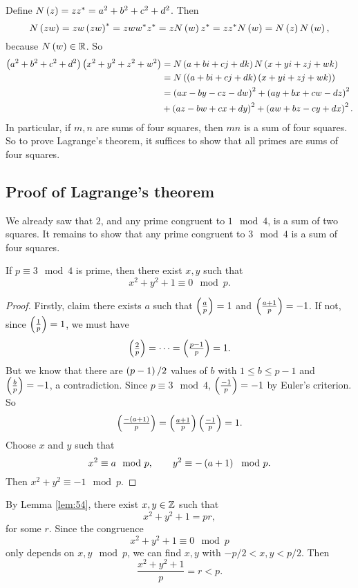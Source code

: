 Define $ N\left( z \right) = zz^* = a^2 + b^2 + c^2 + d^2 $. Then
$$ N\left( zw \right) = zw\left( zw \right)^* = zww^*z^* = zN\left( w \right)z^* = zz^*N\left( w \right) = N\left( z \right)N\left( w \right), $$
because $ N\left( w \right) \in \mathbb{R} $. So
\begin{align*}
\left( a^2 + b^2 + c^2 + d^2 \right)\left( x^2 + y^2 + z^2 + w^2 \right)
& = N\left( a + bi + cj + dk \right)N\left( x + yi + zj + wk \right) \\
& = N\left( \left( a + bi + cj + dk \right)\left( x + yi + zj + wk \right) \right) \\
& = \left( ax - by - cz - dw \right)^2 + \left( ay + bx + cw - dz \right)^2 \\
& + \left( az - bw + cx + dy \right)^2 + \left( aw + bz - cy + dx \right)^2.
\end{align*}
In particular, if $ m, n $ are sums of four squares, then $ mn $ is a sum of four squares. So to prove Lagrange's theorem, it suffices to show that all primes are sums of four squares.

\subsection{Proof of Lagrange's theorem}

We already saw that $ 2 $, and any prime congruent to $ 1 \mod 4 $, is a sum of two squares. It remains to show that any prime congruent to $ 3 \mod 4 $ is a sum of four squares.


\begin{lemma}
\label{lem:54}
If $ p \equiv 3 \mod 4 $ is prime, then there exist $ x, y $ such that
$$ x^2 + y^2 + 1 \equiv 0 \mod p. $$
\end{lemma}

\begin{proof}
Firstly, claim there exists $ a $ such that $ \left( \tfrac{a}{p} \right) = 1 $ and $ \left( \tfrac{a + 1}{p} \right) = -1 $. If not, since $ \left( \tfrac{1}{p} \right) = 1 $, we must have
$$ \left( \tfrac{2}{p} \right) = \dots = \left( \tfrac{p - 1}{p} \right) = 1. $$
But we know that there are $ \left( p - 1 \right) / 2 $ values of $ b $ with $ 1 \le b \le p - 1 $ and $ \left( \tfrac{b}{p} \right) = -1 $, a contradiction. Since $ p \equiv 3 \mod 4 $, $ \left( \tfrac{-1}{p} \right) = -1 $ by Euler's criterion. So
$$ \left( \tfrac{-\left( a + 1 \right)}{p} \right) = \left( \tfrac{a + 1}{p} \right)\left( \tfrac{-1}{p} \right) = 1. $$
Choose $ x $ and $ y $ such that
$$ x^2 \equiv a \mod p, \qquad y^2 \equiv -\left( a + 1 \right) \mod p. $$
Then $ x^2 + y^2 \equiv -1 \mod p $.
\end{proof}

By Lemma \ref{lem:54}, there exist $ x, y \in \mathbb{Z} $ such that
$$ x^2 + y^2 + 1 = pr, $$
for some $ r $. Since the congruence
$$ x^2 + y^2 + 1 \equiv 0 \mod p $$
only depends on $ x, y \mod p $, we can find $ x, y $ with $ -p / 2 < x, y < p / 2 $. Then
$$ \dfrac{x^2 + y^2 + 1}{p} = r < p. $$


